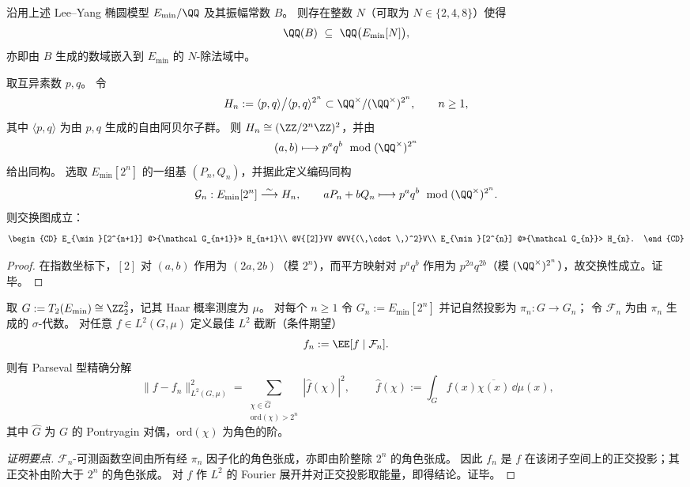 \begin{conjecture}\label{conj:conclusion-leyang-amplitude-division-field}
沿用上述 Lee--Yang 椭圆模型 \(E_{\min}/\QQ\) 及其振幅常数 \(B\)。
则存在整数 \(N\)（可取为 \(N\in\{2,4,8\}\)）使得
\[
\QQ(B)\ \subseteq\ \QQ\bigl(E_{\min}[N]\bigr),
\]
亦即由 \(B\) 生成的数域嵌入到 \(E_{\min}\) 的 \(N\)-除法域中。
\end{conjecture}

\begin{proposition}\label{prop:conclusion-leyang-torsion-godel-kummer-coding}
取互异素数 \(p,q\)。
令
\[
H_n:=\langle p,q\rangle\big/\langle p,q\rangle^{2^n}\subset \QQ^\times/(\QQ^\times)^{2^n},
\qquad n\ge 1,
\]
其中 \(\langle p,q\rangle\) 为由 \(p,q\) 生成的自由阿贝尔子群。
则 \(H_n\cong (\ZZ/2^n\ZZ)^2\)，并由
\[
(a,b)\longmapsto p^a q^b\ \bmod (\QQ^\times)^{2^n}
\]
给出同构。
选取 \(E_{\min}[2^n]\) 的一组基 \((P_n,Q_n)\)，并据此定义编码同构
\[
\mathcal G_n:E_{\min}[2^n]\stackrel{\sim}{\longrightarrow}H_n,\qquad aP_n+bQ_n\longmapsto p^a q^b\ \bmod(\QQ^\times)^{2^n}.
\]
则交换图成立：
\[
\begin{CD}
E_{\min}[2^{n+1}] @>{\mathcal G_{n+1}}>> H_{n+1}\\
@V{[2]}VV @VV{(\,\cdot\,)^2}V\\
E_{\min}[2^{n}] @>>{\mathcal G_{n}}> H_{n}.
\end{CD}
\]
\end{proposition}
\begin{proof}
在指数坐标下，\([2]\) 对 \((a,b)\) 作用为 \((2a,2b)\)（模 \(2^n\)），而平方映射对 \(p^a q^b\) 作用为 \(p^{2a}q^{2b}\)（模 \((\QQ^\times)^{2^n}\)），故交换性成立。证毕。
\end{proof}

\begin{theorem}\label{thm:conclusion-leyang-t2-fourier-truncation-equals-precision}
取 \(G:=T_2(E_{\min})\cong \ZZ_2^2\)，记其 Haar 概率测度为 \(\mu\)。
对每个 \(n\ge 1\) 令 \(G_n:=E_{\min}[2^n]\) 并记自然投影为 \(\pi_n:G\to G_n\)；
令 \(\mathcal F_n\) 为由 \(\pi_n\) 生成的 \(\sigma\)-代数。
对任意 \(f\in L^2(G,\mu)\) 定义最佳 \(L^2\) 截断（条件期望）
\[
f_n:=\EE[f\mid \mathcal F_n].
\]
则有 Parseval 型精确分解
\[
\boxed{\;
\|f-f_n\|_{L^2(G,\mu)}^2
=\sum_{\substack{\chi\in \widehat G\\ \mathrm{ord}(\chi)>2^n}}|\widehat f(\chi)|^2,\;}
\qquad
\widehat f(\chi):=\int_G f(x)\overline{\chi(x)}\,\dd\mu(x),
\]
其中 \(\widehat G\) 为 \(G\) 的 Pontryagin 对偶，\(\mathrm{ord}(\chi)\) 为角色的阶。
\end{theorem}
\begin{proof}[证明要点]
\(\mathcal F_n\)-可测函数空间由所有经 \(\pi_n\) 因子化的角色张成，亦即由阶整除 \(2^n\) 的角色张成。
因此 \(f_n\) 是 \(f\) 在该闭子空间上的正交投影；其正交补由阶大于 \(2^n\) 的角色张成。
对 \(f\) 作 \(L^2\) 的 Fourier 展开并对正交投影取能量，即得结论。证毕。
\end{proof}

